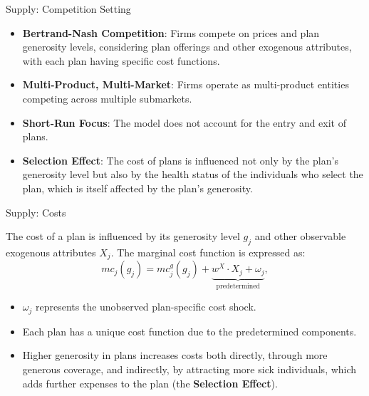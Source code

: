 \documentclass[professionalfonts, aspectratio=169]{beamer}
\begin{document}
\begin{frame}{Supply: Competition Setting}
  \begin{itemize}
    \item \textbf{Bertrand-Nash Competition}: Firms compete on prices and plan generosity levels, considering plan offerings and other exogenous attributes, with each plan having specific cost functions.
    \item \textbf{Multi-Product, Multi-Market}: Firms operate as multi-product entities competing across multiple submarkets.
    \item \textbf{Short-Run Focus}: The model does not account for the entry and exit of plans.
    \item \textbf{Selection Effect}: The cost of plans is influenced not only by the plan's generosity level but also by the health status of the individuals who select the plan, which is itself affected by the plan's generosity.
  \end{itemize}
\end{frame}

\begin{frame}{Supply: Costs}

  The cost of a plan is influenced by its generosity level $g_j$ and other observable exogenous attributes $X_j$. The marginal cost function is expressed as:
  \begin{equation}
    \label{eq:marginal_cost}
    mc_j(g_j) = mc_j^g(g_j) + \underbrace{w^X \cdot X_j + \omega_j}_{\text{predetermined}},
  \end{equation}
  \begin{itemize}\small
    \item $\omega_j$ represents the unobserved plan-specific cost shock.
    \item Each plan has a unique cost function due to the predetermined components.
    \item Higher generosity in plans increases costs both directly, through more generous coverage, and indirectly, by attracting more sick individuals, which adds further expenses to the plan (the \textbf{Selection Effect}).
  \end{itemize}
\end{frame}
\end{document}
